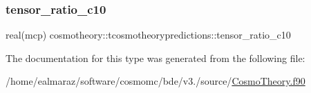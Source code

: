 \subsubsection{\texorpdfstring{tensor\+\_\+ratio\+\_\+c10}{tensor\_ratio\_c10}}
{\footnotesize\ttfamily real(mcp) cosmotheory\+::tcosmotheorypredictions\+::tensor\+\_\+ratio\+\_\+c10\hspace{0.3cm}{\ttfamily [private]}}



The documentation for this type was generated from the following file\+:\begin{DoxyCompactItemize}
\item 
/home/ealmaraz/software/cosmomc/bde/v3./source/\mbox{\hyperlink{CosmoTheory_8f90}{Cosmo\+Theory.\+f90}}\end{DoxyCompactItemize}
